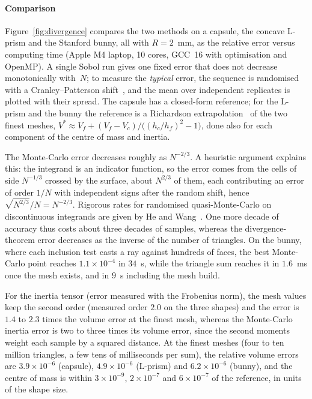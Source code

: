 \documentclass[11pt,a4paper]{article}
\newcommand{\Rmink}{R}                 %
\begin{document}
\paragraph{Comparison} Figure~\ref{fig:divergence} compares the two methods on a
capsule, the concave L-prism and the Stanford bunny, all with $\Rmink=2$~mm,
as the relative error versus computing time (Apple M4 laptop, 10 cores, GCC~16
with optimisation and OpenMP). A single Sobol run gives one fixed error that does
not decrease monotonically with~$N$; to measure the \emph{typical} error, the
sequence is randomised with a Cranley--Patterson shift~\cite{cranley1976}, and the
mean over independent replicates is plotted with their spread. The capsule has a
closed-form reference; for the L-prism and the bunny the reference is a Richardson
extrapolation~\cite{richardson1927} of the two finest meshes,
$V^{*}\approx V_{f}+(V_{f}-V_{c})/\big((h_{c}/h_{f})^{2}-1\big)$, done also for each
component of the centre of mass and inertia.

The Monte-Carlo error decreases roughly as $N^{-2/3}$. A heuristic argument
explains this: the integrand is an indicator function, so the error comes from the
cells of side $N^{-1/3}$ crossed by the surface, about $N^{2/3}$ of them, each
contributing an error of order $1/N$ with independent signs after the random
shift, hence $\sqrt{N^{2/3}}/N=N^{-2/3}$. Rigorous rates for randomised
quasi-Monte-Carlo on discontinuous integrands are given by He and
Wang~\cite{he2015}. One more decade of accuracy thus costs about three decades of
samples, whereas the divergence-theorem error decreases as the inverse of the
number of triangles. On the bunny, where each inclusion test casts a ray against
hundreds of faces, the best Monte-Carlo point reaches $1.1\times10^{-4}$ in
$34$~s, while the triangle sum reaches it in $1.6$~ms once the mesh exists, and in
$9$~s including the mesh build.

For the inertia tensor (error measured with the Frobenius norm), the mesh values
keep the second order (measured order $2.0$ on the three shapes) and the error is
$1.4$ to $2.3$ times the volume error at the finest mesh, whereas the Monte-Carlo
inertia error is two to three times its volume error, since the second moments
weight each sample by a squared distance. At the finest meshes (four to ten million
triangles, a few tens of milliseconds per sum), the relative volume errors are
$3.9\times10^{-6}$ (capsule), $4.9\times10^{-6}$ (L-prism) and $6.2\times10^{-6}$
(bunny), and the centre of mass is within $3\times10^{-9}$, $2\times10^{-7}$ and
$6\times10^{-7}$ of the reference, in units of the shape size.
\end{document}
